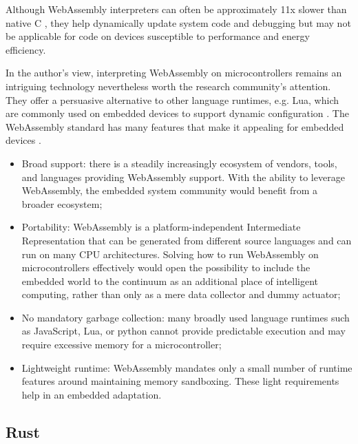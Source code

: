 Although WebAssembly interpreters can often be approximately 11x slower than native C \cite{wasm3-performance}, they help dynamically update system code and debugging but may not be applicable for code on devices susceptible to performance and energy efficiency.

In the author's view, interpreting WebAssembly on microcontrollers remains an intriguing technology nevertheless worth the research community's attention. They offer a persuasive alternative to other language runtimes, e.g. Lua, which are commonly used on embedded devices to support dynamic configuration \cite{levee}. The WebAssembly standard has many features that make it appealing for embedded devices \cite{ewasm}.

\begin{itemize}
    \item Broad support: there is a steadily increasingly ecosystem of vendors, tools, and languages providing WebAssembly support. With the ability to leverage WebAssembly, the embedded system community would benefit from a broader ecosystem;
    \item Portability: WebAssembly is a platform-independent Intermediate Representation that can be generated from different source languages and can run on many CPU architectures. Solving how to run WebAssembly on microcontrollers effectively would open the possibility to include the embedded world to the continuum as an additional place of intelligent computing, rather than only as a mere data collector and dummy actuator;
    \item No mandatory garbage collection: many broadly used language runtimes such as JavaScript, Lua, or python cannot provide predictable execution and may require excessive memory for a microcontroller;
    \item Lightweight runtime: WebAssembly mandates only a small number of runtime features around maintaining memory sandboxing. These light requirements help in an embedded adaptation.
\end{itemize}

\subsection{Rust}
\label{sec:rust}

